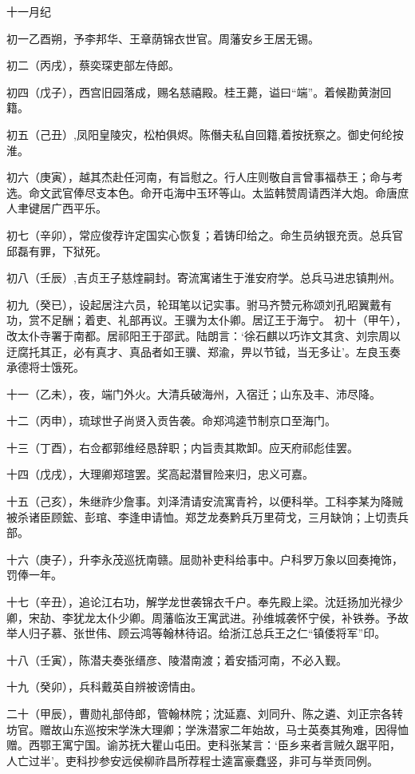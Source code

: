 \documentclass[]{article}
\begin{document}
十一月纪

初一乙酉朔，予李邦华、王章荫锦衣世官。周藩安乡王居无锡。

初二（丙戌），蔡奕琛吏部左侍郎。

初四（戊子），西宫旧园落成，赐名慈禧殿。桂王薨，谥曰``端''。着候勘黄澍回籍。

初五（己丑）,凤阳皇陵灾，松柏俱烬。陈僭夫私自回籍,着按抚察之。御史何纶按淮。

初六（庚寅），越其杰赴任河南，有旨慰之。行人庄则敬自言曾事福恭王；命与考选。命文武官俸尽支本色。命开屯海中玉环等山。太监韩赞周请西洋大炮。命唐庶人聿键居广西平乐。

初七（辛卯），常应俊荐许定国实心恢复；着铸印给之。命生员纳银充贡。总兵官邱磊有罪，下狱死。

初八（壬辰）,吉贞王子慈煃嗣封。寄流寓诸生于淮安府学。总兵马进忠镇荆州。

初九（癸已），设起居注六员，轮珥笔以记实事。驸马齐赞元称颂刘孔昭翼戴有功，赏不足酬；着吏、礼部再议。王骥为太仆卿。居辽王于海宁。
初十（甲午），改太仆寺署于南都。居祁阳王于邵武。陆朗言：`徐石麒以巧诈文其贪、刘宗周以迂腐托其正，必有真才、真品者如王骥、郑渝，畀以节钺，当无多让'。左良玉奏承德将士饿死。

十一（乙未），夜，端门外火。大清兵破海州，入宿迁；山东及丰、沛尽降。

十二（丙申），琉球世子尚贤入贡告袭。命郑鸿逵节制京口至海门。

十三（丁酉），右佥都郭维经恳辞职；内旨责其欺卸。应天府祁彪佳罢。

十四（戊戌），大理卿郑瑄罢。奖高起潜冒险来归，忠义可嘉。

十五（己亥），朱继祚少詹事。刘泽清请安流寓青衿，以便科举。工科李某为降贼被杀诸臣顾鋐、彭琯、李逢申请恤。郑芝龙奏黔兵万里荷戈，三月缺饷；上切责兵部。

十六（庚子），升李永茂巡抚南赣。屈勋补吏科给事中。户科罗万象以回奏掩饰，罚俸一年。

十七（辛丑），追论江右功，解学龙世袭锦衣千户。奉先殿上梁。沈廷扬加光禄少卿，宋劼、李犹龙太仆少卿。周藩临汝王寓武进。孙维城袭怀宁侯，补铁券。予故举人归子慕、张世伟、顾云鸿等翰林待诏。给浙江总兵王之仁``镇倭将军''印。

十八（壬寅），陈潜夫奏张缙彦、陵潜南渡；着安插河南，不必入觐。

十九（癸卯），兵科戴英自辨被谤情由。

二十（甲辰），曹勋礼部侍郎，管翰林院；沈延嘉、刘同升、陈之遴、刘正宗各转坊官。赠故山东巡按宋学洙大理卿；学洙潜家二年始故，马士英奏其殉难，因得恤赠。西鄂王寓宁国。谕苏抚大瞿山屯田。吏科张某言：`臣乡来者言贼久踞平阳，人亡过半'。吏科抄参安远侯柳祚昌所荐程士逵富豪蠢竖，非可与举贡同例。
\end{document}
